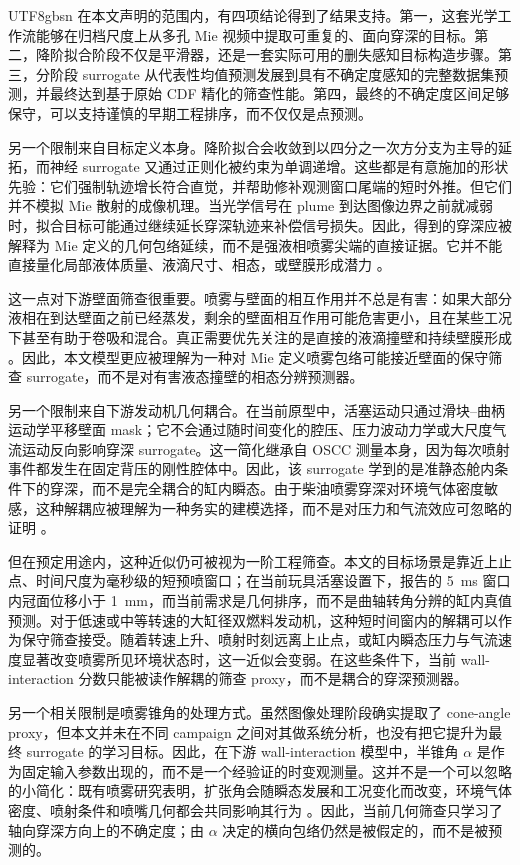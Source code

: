 \documentclass[english, 12pt, a4paper, elec, utf8, a-2b, online]{aaltothesis}
\begin{document}
\begin{CJK*}{UTF8}{gbsn}
在本文声明的范围内，有四项结论得到了结果支持。第一，这套光学工作流能够在归档尺度上从多孔 Mie 视频中提取可重复的、面向穿深的目标。第二，降阶拟合阶段不仅是平滑器，还是一套实际可用的删失感知目标构造步骤。第三，分阶段 surrogate 从代表性均值预测发展到具有不确定度感知的完整数据集预测，并最终达到基于原始 CDF 精化的筛查性能。第四，最终的不确定度区间足够保守，可以支持谨慎的早期工程排序，而不仅仅是点预测。

另一个限制来自目标定义本身。降阶拟合会收敛到以四分之一次方分支为主导的延拓，而神经 surrogate 又通过正则化被约束为单调递增。这些都是有意施加的形状先验：它们强制轨迹增长符合直觉，并帮助修补观测窗口尾端的短时外推。但它们并不模拟 Mie 散射的成像机理。当光学信号在 plume 到达图像边界之前就减弱时，拟合目标可能通过继续延长穿深轨迹来补偿信号损失。因此，得到的穿深应被解释为 Mie 定义的几何包络延续，而不是强液相喷雾尖端的直接证据。它并不能直接量化局部液体质量、液滴尺寸、相态，或壁膜形成潜力 \cite{ecn_liquid_penetration,ecn_liquid_penetration_accessory}。

这一点对下游壁面筛查很重要。喷雾与壁面的相互作用并不总是有害：如果大部分液相在到达壁面之前已经蒸发，剩余的壁面相互作用可能危害更小，且在某些工况下甚至有助于卷吸和混合。真正需要优先关注的是直接的液滴撞壁和持续壁膜形成 \cite{MorieiraMotaPanao2010,liu2024marine_impingement,peraza2022swi,ahmad2025fueldilution}。因此，本文模型更应被理解为一种对 Mie 定义喷雾包络可能接近壁面的保守筛查 surrogate，而不是对有害液态撞壁的相态分辨预测器。

另一个限制来自下游发动机几何耦合。在当前原型中，活塞运动只通过滑块--曲柄运动学平移壁面 mask；它不会通过随时间变化的腔压、压力波动力学或大尺度气流运动反向影响穿深 surrogate。这一简化继承自 OSCC 测量本身，因为每次喷射事件都发生在固定背压的刚性腔体中。因此，该 surrogate 学到的是准静态舱内条件下的穿深，而不是完全耦合的缸内瞬态。由于柴油喷雾穿深对环境气体密度敏感，这种解耦应被理解为一种务实的建模选择，而不是对压力和气流效应可忽略的证明 \cite{NaberSiebers1996}。

但在预定用途内，这种近似仍可被视为一阶工程筛查。本文的目标场景是靠近上止点、时间尺度为毫秒级的短预喷窗口；在当前玩具活塞设置下，报告的 \SI{5}{ms} 窗口内冠面位移小于 \SI{1}{mm}，而当前需求是几何排序，而不是曲轴转角分辨的缸内真值预测。对于低速或中等转速的大缸径双燃料发动机，这种短时间窗内的解耦可以作为保守筛查接受。随着转速上升、喷射时刻远离上止点，或缸内瞬态压力与气流速度显著改变喷雾所见环境状态时，这一近似会变弱。在这些条件下，当前 wall-interaction 分数只能被读作解耦的筛查 proxy，而不是耦合的穿深预测器。

另一个相关限制是喷雾锥角的处理方式。虽然图像处理阶段确实提取了 cone-angle proxy，但本文并未在不同 campaign 之间对其做系统分析，也没有把它提升为最终 surrogate 的学习目标。因此，在下游 wall-interaction 模型中，半锥角 $\alpha$ 是作为固定输入参数出现的，而不是一个经验证的时变观测量。这并不是一个可以忽略的小简化：既有喷雾研究表明，扩张角会随瞬态发展和工况变化而改变，环境气体密度、喷射条件和喷嘴几何都会共同影响其行为 \cite{NaberSiebers1996,JungManinSkeenPickett2015}。因此，当前几何筛查只学习了轴向穿深方向上的不确定度；由 $\alpha$ 决定的横向包络仍然是被假定的，而不是被预测的。


\end{CJK*}
\end{document}

